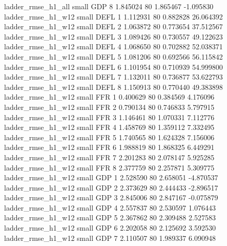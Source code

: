       ladder_rmse_h1_all      small      GDP                 8 1.845024 80       1.865467          -1.095830
      ladder_rmse_h1_w12      small     DEFL                 1 1.112931 80       0.882828          26.064392
      ladder_rmse_h1_w12      small     DEFL                 2 1.063872 80       0.773654          37.512567
      ladder_rmse_h1_w12      small     DEFL                 3 1.089426 80       0.730557          49.122623
      ladder_rmse_h1_w12      small     DEFL                 4 1.068650 80       0.702882          52.038371
      ladder_rmse_h1_w12      small     DEFL                 5 1.081206 80       0.692566          56.115842
      ladder_rmse_h1_w12      small     DEFL                 6 1.101954 80       0.710939          54.999800
      ladder_rmse_h1_w12      small     DEFL                 7 1.132011 80       0.736877          53.622793
      ladder_rmse_h1_w12      small     DEFL                 8 1.150913 80       0.770440          49.383898
      ladder_rmse_h1_w12      small      FFR                 1 0.400629 80       0.384569           4.176096
      ladder_rmse_h1_w12      small      FFR                 2 0.790134 80       0.746833           5.797915
      ladder_rmse_h1_w12      small      FFR                 3 1.146461 80       1.070331           7.112776
      ladder_rmse_h1_w12      small      FFR                 4 1.458769 80       1.359112           7.332495
      ladder_rmse_h1_w12      small      FFR                 5 1.740565 80       1.624328           7.156006
      ladder_rmse_h1_w12      small      FFR                 6 1.988819 80       1.868325           6.449291
      ladder_rmse_h1_w12      small      FFR                 7 2.201283 80       2.078147           5.925285
      ladder_rmse_h1_w12      small      FFR                 8 2.377759 80       2.257871           5.309775
      ladder_rmse_h1_w12      small      GDP                 1 2.528590 80       2.658051          -4.870537
      ladder_rmse_h1_w12      small      GDP                 2 2.373629 80       2.444433          -2.896517
      ladder_rmse_h1_w12      small      GDP                 3 2.845006 80       2.847167          -0.075879
      ladder_rmse_h1_w12      small      GDP                 4 2.557837 80       2.530597           1.076443
      ladder_rmse_h1_w12      small      GDP                 5 2.367862 80       2.309488           2.527583
      ladder_rmse_h1_w12      small      GDP                 6 2.202058 80       2.125692           3.592530
      ladder_rmse_h1_w12      small      GDP                 7 2.110507 80       1.989337           6.090948
